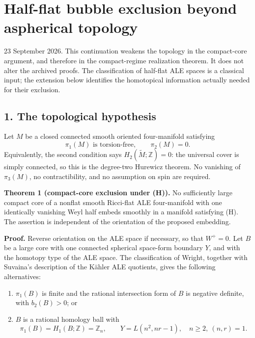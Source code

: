 \documentclass[
  11pt,
]{article}
\author{}
\date{}
\providecommand{\tightlist}{%
  \setlength{\itemsep}{0pt}\setlength{\parskip}{0pt}}
\begin{document}
\hypertarget{half-flat-bubble-exclusion-beyond-aspherical-topology}{%
\section{Half-flat bubble exclusion beyond aspherical
topology}\label{half-flat-bubble-exclusion-beyond-aspherical-topology}}

23 September 2026. This continuation weakens the topology in the
compact-core argument, and therefore in the compact-regime realization
theorem. It does not alter the archived proofs. The classification of
half-flat ALE spaces is a classical input; the extension below
identifies the homotopical information actually needed for their
exclusion.

\hypertarget{the-topological-hypothesis}{%
\subsection{1. The topological
hypothesis}\label{the-topological-hypothesis}}

Let \(M\) be a closed connected smooth oriented four-manifold satisfying
\[
 \pi_1(M)\text{ is torsion-free},\qquad \pi_2(M)=0.       \tag{H}
\] Equivalently, the second condition says
\(H_2(\widetilde M;\mathbb Z)=0\): the universal cover is simply
connected, so this is the degree-two Hurewicz theorem. No vanishing of
\(\pi_3(M)\), no contractibility, and no assumption on spin are
required.

\textbf{Theorem 1 (compact-core exclusion under (H)).} No sufficiently
large compact core of a nonflat smooth Ricci-flat ALE four-manifold with
one identically vanishing Weyl half embeds smoothly in a manifold
satisfying (H). The assertion is independent of the orientation of the
proposed embedding.

\textbf{Proof.} Reverse orientation on the ALE space if necessary, so
that \(W^+=0\). Let \(B\) be a large core with one connected spherical
space-form boundary \(Y\), and with the homotopy type of the ALE space.
The classification of Wright, together with Suvaina's description of the
Kähler ALE quotients, gives the following alternatives:

\begin{enumerate}
\def\labelenumi{\arabic{enumi}.}
\tightlist
\item
  \(\pi_1(B)\) is finite and the rational intersection form of \(B\) is
  negative definite, with \(b_2(B)>0\); or
\item
  \(B\) is a rational homology ball with \[
  \pi_1(B)=H_1(B;\mathbb Z)=\mathbb Z_n,
  \qquad Y=L(n^2,nr-1),\quad n\ge2,\ (n,r)=1.
  \tag{1}
  \]
\end{enumerate}
\end{document}
